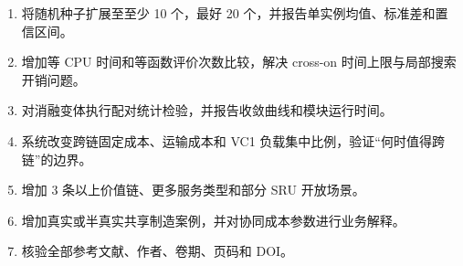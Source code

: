 \documentclass[UTF8,11pt]{ctexart}
\begin{document}
\begin{enumerate}
\item 将随机种子扩展至至少 10 个，最好 20 个，并报告单实例均值、标准差和置信区间。
\item 增加等 CPU 时间和等函数评价次数比较，解决 cross-on 时间上限与局部搜索开销问题。
\item 对消融变体执行配对统计检验，并报告收敛曲线和模块运行时间。
\item 系统改变跨链固定成本、运输成本和 VC1 负载集中比例，验证“何时值得跨链”的边界。
\item 增加 3 条以上价值链、更多服务类型和部分 SRU 开放场景。
\item 增加真实或半真实共享制造案例，并对协同成本参数进行业务解释。
\item 核验全部参考文献、作者、卷期、页码和 DOI。
\end{enumerate}
\end{document}
